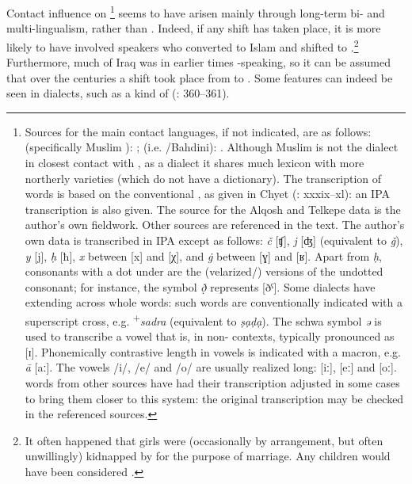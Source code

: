 \documentclass[output=paper]{langsci/langscibook}
\begin{document}
Contact influence on \footnote{Sources for the main contact languages, if not indicated, are as follows:   (specifically Muslim ): \citet{WoodheadEtAl1967};   (i.e. /Bahdini): \citet{Chyet2003}. Although Muslim   is not the dialect in closest contact with , as a  dialect it shares much lexicon with more northerly varieties (which do not have a dictionary). The transcription of   words is based on the conventional , as given in Chyet (\citeyear{Chyet2003}: xxxix–xl): an IPA transcription is also given. The source for the  Alqosh and  Telkepe data is the author’s own fieldwork. Other sources are referenced in the text. The author’s own  data is transcribed in IPA except as follows: \textit{č} [ʧ], \textit{j} [ʤ] (equivalent to  \textit{ǧ}), \textit{y} [j], \textit{ḥ} [ħ], \textit{x} between [x] and [χ], and \textit{\.g} between [ɣ] and [ʁ]. Apart from \textit{ḥ}, consonants with a dot under are the  (velarized/) versions of the undotted consonant; for instance, the symbol \textit{ð̣} represents [ðˤ]. Some dialects have  extending across whole words: such words are conventionally indicated with a superscript cross, e.g. \textrm{\textsuperscript{+}}\textrm{\textit{sadra} }\textrm{(equivalent to} \textrm{\textit{ṣạḍ{\R}ạ}}). The schwa symbol \textit{ə} is used to transcribe a  vowel that is, in non- contexts, typically pronounced as [ɪ]. Phonemically contrastive length in vowels is indicated with a macron, e.g. \textit{ā} [aː]. The vowels /i/, /e/ and /o/ are usually realized long: [iː], [eː] and [oː].  words from other sources have had their transcription adjusted in some cases to bring them closer to this system: the original transcription may be checked in the referenced sources.} seems to have arisen mainly through long-term bi- and multi-lingualism, rather than . Indeed, if any shift has taken place, it is more likely to have involved  speakers who converted to Islam and shifted to .\footnote{It often happened that  girls were (occasionally by arrangement, but often unwillingly) kidnapped by  for the purpose of marriage. Any children would have been considered .} Furthermore, much of Iraq was in earlier times -speaking, so it can be assumed that over the centuries a shift took place from  to . Some   features can indeed be seen in   dialects, such as a kind of  (\citealt{Coghill2014}: 360–361).
\end{document}
